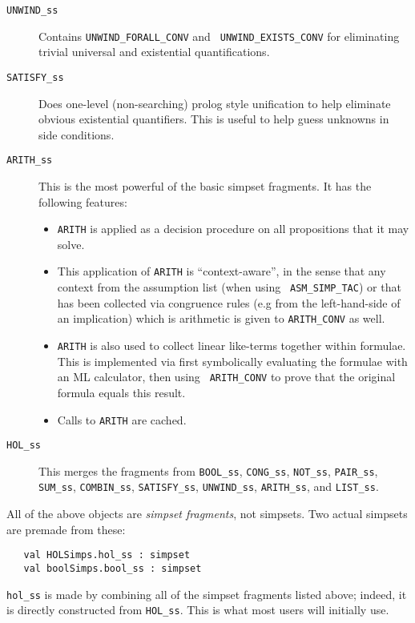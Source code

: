 \begin{description}
\item[{\tt UNWIND\_ss}] Contains {\tt UNWIND\_FORALL\_CONV} and {\tt
    UNWIND\_EXISTS\_CONV} for eliminating trivial universal and
  existential quantifications.

\item[{\tt SATISFY\_ss}] Does one-level (non-searching) prolog style
  unification to help eliminate obvious existential quantifiers.  This
  is useful to help guess unknowns in side conditions.

\item[{\tt ARITH\_ss}] This is the most powerful of the basic
  simpset fragments.  It has the following features:
  \begin{itemize}
  \item {\tt ARITH} is applied as a decision procedure
    on all propositions that it may solve.
  \item This application of {\tt ARITH} is ``context-aware'', in the
    sense that any context from the assumption list (when using {\tt
      ASM\_SIMP\_TAC}) or that has been collected via congruence rules
    (e.g from the left-hand-side of an implication) which is
    arithmetic is given to {\tt ARITH\_CONV} as well.
  \item {\tt ARITH} is also used to collect linear like-terms together
    within formulae.  This is implemented via first symbolically
    evaluating the formulae with an ML calculator, then using {\tt
      ARITH\_CONV} to prove that the original formula equals this
    result.
  \item Calls to {\tt ARITH} are cached.
  \end{itemize}

\item[{\tt HOL\_ss}] This merges the fragments from {\tt BOOL\_ss}, 
  {\tt CONG\_ss}, {\tt NOT\_ss}, {\tt PAIR\_ss}, 
  {\tt SUM\_ss}, {\tt COMBIN\_ss}, {\tt SATISFY\_ss}, 
  {\tt UNWIND\_ss}, {\tt ARITH\_ss}, and {\tt LIST\_ss}.
\end{description}

All of the above objects are {\em simpset fragments}, not simpsets.
Two actual simpsets are premade from these:
\begin{boxed} \begin{verbatim}
   val HOLSimps.hol_ss : simpset
   val boolSimps.bool_ss : simpset
\end{verbatim} \end{boxed}
{\tt hol\_ss} is made by combining all of the simpset fragments listed
above; indeed, it is directly constructed from {\tt HOL\_ss}.  This is
what most users will initially use.

